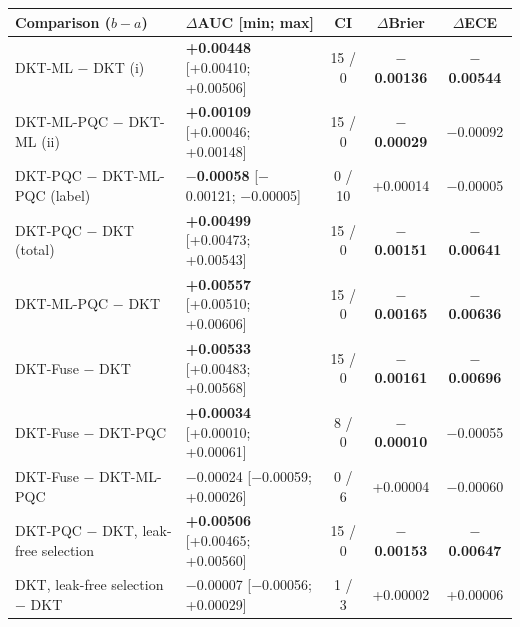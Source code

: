 \begin{tabular}{@{}l l c c c@{}}
\toprule
Comparison ($b-a$) & $\Delta$AUC [min; max] & CI & $\Delta$Brier & $\Delta$ECE \\
\midrule
DKT-ML $-$ DKT (i) & \textbf{+0.00448} [+0.00410; +0.00506] & 15 / 0 & \textbf{$-$0.00136} & \textbf{$-$0.00544} \\
DKT-ML-PQC $-$ DKT-ML (ii) & \textbf{+0.00109} [+0.00046; +0.00148] & 15 / 0 & \textbf{$-$0.00029} & $-$0.00092 \\
DKT-PQC $-$ DKT-ML-PQC (label) & \textbf{$-$0.00058} [$-$0.00121; $-$0.00005] & 0 / 10 & +0.00014 & $-$0.00005 \\
DKT-PQC $-$ DKT (total) & \textbf{+0.00499} [+0.00473; +0.00543] & 15 / 0 & \textbf{$-$0.00151} & \textbf{$-$0.00641} \\
\midrule
DKT-ML-PQC $-$ DKT & \textbf{+0.00557} [+0.00510; +0.00606] & 15 / 0 & \textbf{$-$0.00165} & \textbf{$-$0.00636} \\
DKT-Fuse $-$ DKT & \textbf{+0.00533} [+0.00483; +0.00568] & 15 / 0 & \textbf{$-$0.00161} & \textbf{$-$0.00696} \\
DKT-Fuse $-$ DKT-PQC & \textbf{+0.00034} [+0.00010; +0.00061] & 8 / 0 & \textbf{$-$0.00010} & $-$0.00055 \\
DKT-Fuse $-$ DKT-ML-PQC & $-$0.00024 [$-$0.00059; +0.00026] & 0 / 6 & +0.00004 & $-$0.00060 \\
\midrule
DKT-PQC $-$ DKT, leak-free selection & \textbf{+0.00506} [+0.00465; +0.00560] & 15 / 0 & \textbf{$-$0.00153} & \textbf{$-$0.00647} \\
DKT, leak-free selection $-$ DKT & $-$0.00007 [$-$0.00056; +0.00029] & 1 / 3 & +0.00002 & +0.00006 \\
\bottomrule
\end{tabular}
